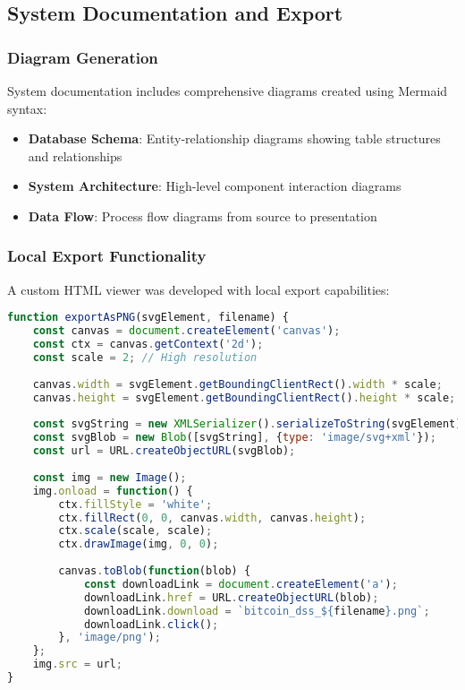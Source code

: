 \documentclass[12pt,a4paper]{article}
\begin{document}
\subsection{System Documentation and Export}

\subsubsection{Diagram Generation}
System documentation includes comprehensive diagrams created using Mermaid syntax:

\begin{itemize}
    \item \textbf{Database Schema}: Entity-relationship diagrams showing table structures and relationships
    \item \textbf{System Architecture}: High-level component interaction diagrams
    \item \textbf{Data Flow}: Process flow diagrams from source to presentation
\end{itemize}

\subsubsection{Local Export Functionality}
A custom HTML viewer was developed with local export capabilities:

\begin{lstlisting}[language=JavaScript]
function exportAsPNG(svgElement, filename) {
    const canvas = document.createElement('canvas');
    const ctx = canvas.getContext('2d');
    const scale = 2; // High resolution
    
    canvas.width = svgElement.getBoundingClientRect().width * scale;
    canvas.height = svgElement.getBoundingClientRect().height * scale;
    
    const svgString = new XMLSerializer().serializeToString(svgElement);
    const svgBlob = new Blob([svgString], {type: 'image/svg+xml'});
    const url = URL.createObjectURL(svgBlob);
    
    const img = new Image();
    img.onload = function() {
        ctx.fillStyle = 'white';
        ctx.fillRect(0, 0, canvas.width, canvas.height);
        ctx.scale(scale, scale);
        ctx.drawImage(img, 0, 0);
        
        canvas.toBlob(function(blob) {
            const downloadLink = document.createElement('a');
            downloadLink.href = URL.createObjectURL(blob);
            downloadLink.download = `bitcoin_dss_${filename}.png`;
            downloadLink.click();
        }, 'image/png');
    };
    img.src = url;
}
\end{lstlisting}
\end{document}
